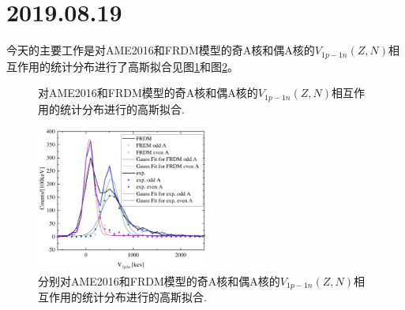 \section{2019.08.19}
今天的主要工作是对AME2016和FRDM模型的奇A核和偶A核的$V_{1p-1n}(Z,N)$相互作用的统计分布进行了高斯拟合见图\ref{fig_FRDMexpV1p1nt}和图\ref{fig_FRDMexpV1p1n}。
\begin{figure}[H]
\centering
{}
\qquad
{}
\caption{对AME2016和FRDM模型的奇A核和偶A核的$V_{1p-1n}(Z,N)$相互作用的统计分布进行的高斯拟合.\label{fig_FRDMexpV1p1nt}}
\end{figure}
\begin{figure}[H]
\centering
\includegraphics[width=0.5\textwidth]{figure/FRDMexpV1p1n.pdf}
\caption{分别对AME2016和FRDM模型的奇A核和偶A核的$V_{1p-1n}(Z,N)$相互作用的统计分布进行的高斯拟合.\label{fig_FRDMexpV1p1n}}
\end{figure}
